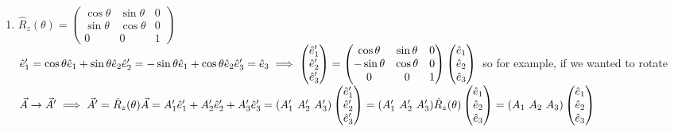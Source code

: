 \documentclass[12pt]{amsart}
\begin{document}
\begin{enumerate}
\hdashrule[0.5ex][c]{\linewidth}{0.5pt}{1.5mm}


\item \underline{$\hat{R}_z(\theta) = \begin{pmatrix} \cos \theta & \sin \theta  & 0 \\ \sin \theta& \cos \theta & 0 \\ 0 & 0 & 1 \end{pmatrix}$}\\
$\hat{e}'_1 = \cos \theta \hat{e}_1 + \sin \theta \hat{e}_2\\
\hat{e}'_2 = - \sin \theta \hat{e}_1 + \cos \theta \hat{e}_2\\
\hat{e}'_3 = \hat{e}_3\\
\implies \begin{pmatrix} \hat{e}'_1 \\ \hat{e}'_2 \\ \hat{e}'_3 \end{pmatrix} = \begin{pmatrix} \cos \theta & \sin \theta & 0 \\ - \sin \theta & \cos \theta & 0 \\ 0 & 0 & 1 \end{pmatrix} \begin{pmatrix} \hat{e}_1 \\ \hat{e}_2 \\ \hat{e}_3 \end{pmatrix}\\$
so for example, if we wanted to rotate $\vec{A} \rightarrow \vec{A}'\\
\implies \vec{A}' = \hat{R}_z(\theta) \vec{A} = A_1' \hat{e}_1' + A'_2 \hat{e}_2' + A'_3 \hat{e}_3'\\
= (A_1'\,\, A_2'\,\, A_3') \begin{pmatrix} \hat{e}_1' \\ \hat{e}_2' \\ \hat{e}_3' \end{pmatrix} = (A_1' \,\, A_2' \,\, A_3' ) \hat{R}_z(\theta) \begin{pmatrix} \hat{e}_1 \\ \hat{e}_2 \\ \hat{e}_3 \end{pmatrix} = ( A_1 \,\, A_2 \,\, A_3) \begin{pmatrix} \hat{e}_1 \\ \hat{e}_2 \\ \hat{e}_3 \end{pmatrix}$



\end{enumerate}
\end{document}
